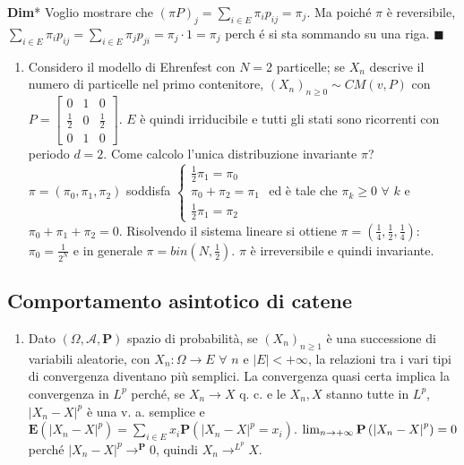 \documentclass{article}
\begin{document}
\textbf{Dim}* Voglio mostrare che $\left( \pi P\right) _{j}=\sum_{i\in E}\pi
_{i}p_{ij}=\pi _{j}$. Ma poich\'{e} $\pi $ \`{e} reversibile, $\sum_{i\in
E}\pi _{i}p_{ij}=\sum_{i\in E}\pi _{j}p_{ji}=\pi _{j}\cdot 1=\pi _{j}$ perch%
\'{e} si sta sommando su una riga. $\blacksquare $

\begin{enumerate}
\item Considero il modello di Ehrenfest con $N=2$ particelle; se $X_{n}$
descrive il numero di particelle nel primo contenitore, $\left( X_{n}\right)
_{n\geq 0}\sim CM\left( v,P\right) $ con $P=\left[ 
\begin{array}{ccc}
0 & 1 & 0 \\ 
\frac{1}{2} & 0 & \frac{1}{2} \\ 
0 & 1 & 0%
\end{array}%
\right] $. $E$ \`{e} quindi irriducibile e tutti gli stati sono ricorrenti
con periodo $d=2$. Come calcolo l'unica distribuzione invariante $\pi $? $%
\pi =\left( \pi _{0},\pi _{1},\pi _{2}\right) $ soddisfa $\left\{ 
\begin{array}{c}
\frac{1}{2}\pi _{1}=\pi _{0} \\ 
\pi _{0}+\pi _{2}=\pi _{1} \\ 
\frac{1}{2}\pi _{1}=\pi _{2}%
\end{array}%
\right. $ ed \`{e} tale che $\pi _{k}\geq 0$ $\forall $ $k$ e $\pi _{0}+\pi
_{1}+\pi _{2}=0$. Risolvendo il sistema lineare si ottiene $\pi =\left( 
\frac{1}{4},\frac{1}{2},\frac{1}{4}\right) $: $\pi _{0}=\frac{1}{2^{N}}$ e
in generale $\pi =bin\left( N,\frac{1}{2}\right) $. $\pi $ \`{e}
irreversibile e quindi invariante.
\end{enumerate}

\subsection{Comportamento asintotico di catene}

\begin{enumerate}
\item Dato $\left( \Omega ,\mathcal{A},\mathbf{P}\right) $ spazio di
probabilit\`{a}, se $\left( X_{n}\right) _{n\geq 1}$ \`{e} una successione
di variabili aleatorie, con $X_{n}:\Omega \rightarrow E$ $\forall $ $n$ e $%
\left\vert E\right\vert <+\infty $, la relazioni tra i vari tipi di
convergenza diventano pi\`{u} semplici. La convergenza quasi certa implica
la convergenza in $L^{p}$ perch\'{e}, se $X_{n}\rightarrow X$ q. c. e le $%
X_{n},X$ stanno tutte in $L^{p}$, $\left\vert X_{n}-X\right\vert ^{p}$ \`{e}
una v. a. semplice e $\mathbf{E}\left( \left\vert X_{n}-X\right\vert
^{p}\right) =\sum_{i\in E}x_{i}\mathbf{P}\left( \left\vert
X_{n}-X\right\vert ^{p}=x_{i}\right) $. $\lim_{n\rightarrow +\infty }\mathbf{%
P}\left( \left\vert X_{n}-X\right\vert ^{p}\right) =0$ perch\'{e} $%
\left\vert X_{n}-X\right\vert ^{p}\rightarrow ^{\mathbf{P}}0$, quindi $%
X_{n}\rightarrow ^{L^{p}}X$.
\end{enumerate}
\end{document}

